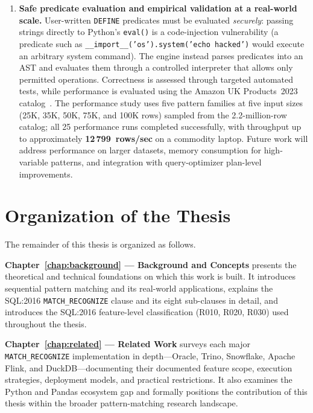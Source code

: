 \begin{enumerate}
  \item \textbf{Safe predicate evaluation and empirical
    validation at a real-world scale.}
    User-written \texttt{DEFINE} predicates must be evaluated
    \emph{securely}: passing strings directly to Python's
    \texttt{eval()} is a code-injection vulnerability (a predicate
    such as \texttt{\_\_import\_\_('os').system('echo hacked')}
    would execute an arbitrary system command).  The engine instead parses
    predicates into an AST and evaluates them through a controlled
    interpreter that allows only permitted operations.  Correctness
    is assessed through targeted automated tests, while performance
    is evaluated using the Amazon UK Products~2023
    catalog~\cite{asaniczka2023amazon}.  The performance study
    uses five pattern families at five input sizes
    (25K, 35K, 50K, 75K, and 100K rows) sampled from the
    2.2-million-row catalog; all 25 performance runs completed
    successfully, with throughput up to approximately
    \textbf{12\,799~rows/sec} on a commodity laptop.
    Future work will address performance on larger datasets,
    memory consumption for high-variable patterns, and integration
    with query-optimizer plan-level improvements.

\end{enumerate}

\section{Organization of the Thesis}
\label{sec:thesis-organization}

The remainder of this thesis is organized as follows.

\textbf{Chapter~\ref{chap:background} --- Background and Concepts}
presents the theoretical and technical foundations on which this work is built.  It introduces sequential pattern matching and its
real-world applications, explains the SQL:2016
\texttt{MATCH\_RECOGNIZE} clause and its eight sub-clauses in
detail, and introduces the SQL:2016 feature-level classification
(R010, R020, R030)
used throughout the thesis.

\textbf{Chapter~\ref{chap:related} --- Related Work}
surveys each major \texttt{MATCH\_RECOGNIZE} implementation in
depth---Oracle, Trino, Snowflake, Apache Flink, and DuckDB---documenting
their documented feature scope, execution strategies, deployment
models, and practical
restrictions.  It also examines the Python and Pandas ecosystem
gap and formally positions the contribution of this thesis within
the broader pattern-matching research landscape.

